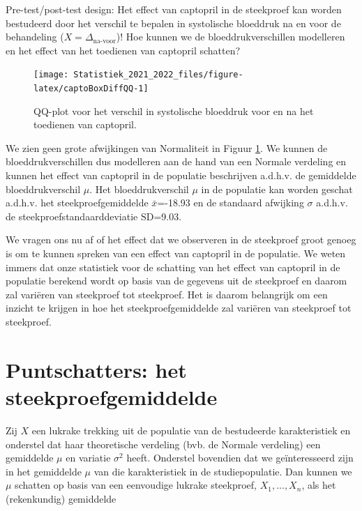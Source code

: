 \documentclass[
  12pt,dutch,coursenotes]{book}
\theoremstyle{definition}
\theoremstyle{definition}
\theoremstyle{definition}
\theoremstyle{definition}
\theoremstyle{remark}
\begin{document}
Pre-test/post-test design: Het effect van captopril in de steekproef kan worden bestudeerd door het verschil te bepalen in systolische bloeddruk na en voor de behandeling (\(X=\Delta_\text{na-voor}\))!
Hoe kunnen we de bloeddrukverschillen modelleren en het effect van het toedienen van captopril schatten?

\begin{figure}

{\centering \texttt{[image: Statistiek\_2021\_2022\_files/figure-latex/captoBoxDiffQQ-1]} 

}

\caption{QQ-plot voor het verschil in systolische bloeddruk voor en na het toedienen van captopril.}\label{fig:captoBoxDiffQQ}
\end{figure}

We zien geen grote afwijkingen van Normaliteit in Figuur \ref{fig:captoBoxDiffQQ}.
We kunnen de bloeddrukverschillen dus modelleren aan de hand van een Normale verdeling en kunnen het effect van captopril in de populatie beschrijven a.d.h.v. de gemiddelde bloeddrukverschil \(\mu\).
Het bloeddrukverschil \(\mu\) in de populatie kan worden geschat a.d.h.v. het steekproefgemiddelde \(\bar x\)=-18.93 en de standaard afwijking \(\sigma\) a.d.h.v. de steekproefstandaarddeviatie \(\text{SD}\)=9.03.

We vragen ons nu af of het effect dat we observeren in de steekproef groot genoeg is om te kunnen spreken van een effect van captopril in de populatie.
We weten immers dat onze statistiek voor de schatting van het effect van captopril in de populatie berekend wordt op basis van de gegevens uit de steekproef en daarom zal variëren van steekproef tot steekproef.
Het is daarom belangrijk om een inzicht te krijgen in hoe het steekproefgemiddelde zal variëren van steekproef tot steekproef.

\hypertarget{puntschatters-het-steekproefgemiddelde}{%
\section{Puntschatters: het steekproefgemiddelde}\label{puntschatters-het-steekproefgemiddelde}}

Zij \(X\) een lukrake trekking uit de populatie van de bestudeerde karakteristiek en onderstel dat haar theoretische verdeling (bvb. de Normale verdeling) een gemiddelde \(\mu\) en variatie \(\sigma^2\) heeft.
Onderstel bovendien dat we geïnteresseerd zijn in het gemiddelde \(\mu\) van die karakteristiek in de studiepopulatie.
Dan kunnen we \(\mu\) schatten op basis van een eenvoudige lukrake steekproef, \(X_1,...,X_n\), als het (rekenkundig) gemiddelde
\end{document}
